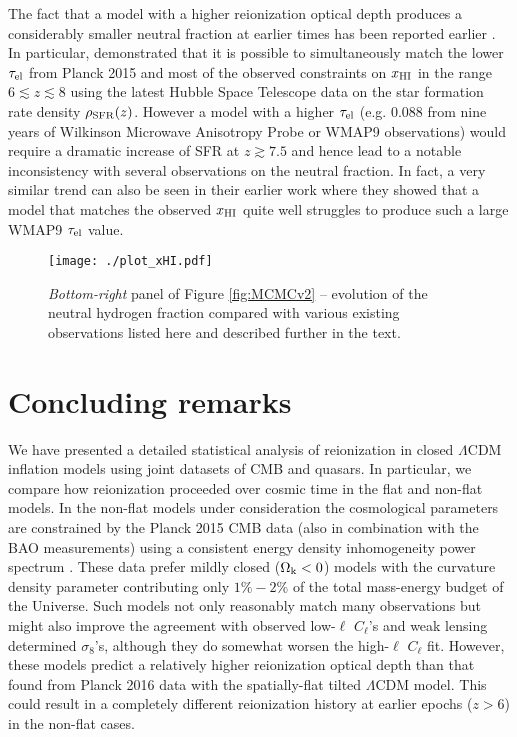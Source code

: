 \documentclass[useAMS,usenatbib]{mnras}
\begin{document}
 The fact that a model with a higher reionization optical depth produces
 a considerably smaller neutral fraction at earlier times has been reported earlier
 \citep{2013ApJ...768...71R,2015ApJ...802L..19R,2015ApJ...811..140B,mitra4}. In particular, \cite{2015ApJ...802L..19R}
 demonstrated that it is possible to simultaneously match the lower $\tau_{\rm el}$ from Planck 2015
 and most of the observed constraints on $x_{\rm HI}$ in the range $6\lesssim z\lesssim8$ using the
 latest Hubble Space Telescope data on the star formation rate density $\rho_{\rm SFR}(z)$.
 However a model with a higher $\tau_{\rm el}$ (e.g. $0.088$ from nine years of
 Wilkinson  Microwave Anisotropy Probe or WMAP9 observations) would require a 
dramatic increase of SFR at $z\gtrsim7.5$ and hence lead to a notable 
inconsistency with several observations on the neutral fraction. In fact, a 
very similar trend can also be seen in their earlier work
 \citep{2013ApJ...768...71R} where they showed that a model that matches the 
observed $x_{\rm HI}$ quite well struggles to produce such a large WMAP9 
$\tau_{\rm el}$ value.

\begin{figure}
\centering
  \texttt{[image: ./plot\_xHI.pdf]}
  \caption{{\it Bottom-right} panel of Figure \ref{fig:MCMCv2} -- evolution of 
  the neutral hydrogen fraction compared with various existing observations listed here and described
  further in the text.}
\label{fig:xHI}
\end{figure}
 
\section{Concluding remarks}
\label{sec:conclusions}

We have presented a detailed statistical analysis of reionization in closed
$\Lambda$CDM inflation models using joint datasets of CMB and quasars. In 
particular, we compare how reionization proceeded over cosmic time in the 
flat and non-flat models. In the non-flat models under consideration the 
cosmological parameters are constrained by the Planck 2015 CMB data (also in 
combination with the BAO measurements) using a consistent energy density 
inhomogeneity power spectrum \citep{2017arXiv170703452O}. These data prefer 
mildly closed ($\Omega_{\rm k}<0$) models with the curvature density 
parameter contributing only $1\%-2\%$ of the total mass-energy budget of 
the Universe. Such models not only reasonably match many observations but 
might also improve the agreement with observed low-$\ell$ $C_\ell$'s and
weak lensing determined $\sigma_8$'s, although they do somewhat worsen the
high-$\ell$ $C_\ell$ fit. However, these models predict a 
relatively higher reionization optical depth than that found from Planck 
2016 data with the spatially-flat tilted $\Lambda$CDM model. This could 
result in a completely different reionization history at earlier epochs ($z>6$)
in the non-flat cases.
\end{document}
